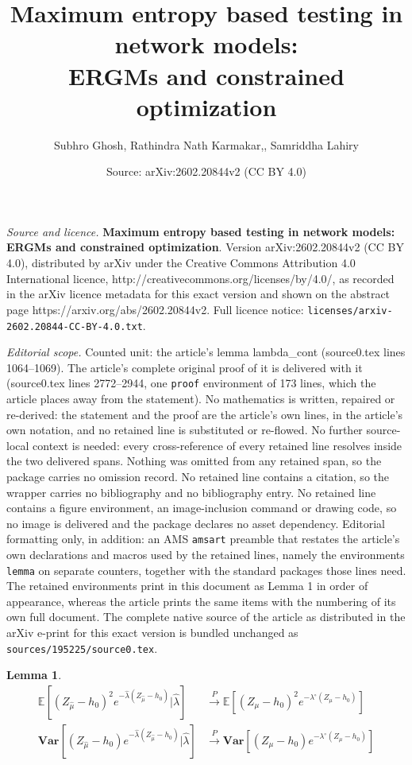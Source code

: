 \documentclass[10pt,a4paper]{amsart}
\title{\textbf{Maximum entropy based testing in network models: \\ ERGMs and constrained optimization}}
\author{Subhro Ghosh, Rathindra Nath Karmakar,, Samriddha Lahiry}
\date{Source: arXiv:2602.20844v2 (CC BY 4.0)}
\newtheorem{lemma}{Lemma}
\begin{document}
\maketitle

\noindent\emph{Source and licence.} \textbf{Maximum entropy based testing in network models: \\ ERGMs and constrained optimization}. Version arXiv:2602.20844v2 (CC BY 4.0), distributed by arXiv under the Creative Commons Attribution 4.0 International licence, http://creativecommons.org/licenses/by/4.0/, as recorded in the arXiv licence metadata for this exact version and shown on the abstract page https://arxiv.org/abs/2602.20844v2. Full licence notice: \texttt{licenses/arxiv-2602.20844-CC-BY-4.0.txt}.\par\smallskip

\noindent\textit{Editorial scope.} Counted unit: the article's lemma lambda\_cont (source0.tex lines 1064--1069). The article's complete original proof of it is delivered with it (source0.tex lines 2772--2944, one \texttt{proof} environment of 173 lines, which the article places away from the statement). No mathematics is written, repaired or re-derived: the statement and the proof are the article's own lines, in the article's own notation, and no retained line is substituted or re-flowed.  No further source-local context is needed: every cross-reference of every retained line resolves inside the two delivered spans.  Nothing was omitted from any retained span, so the package carries no omission record.  No retained line contains a citation, so the wrapper carries no bibliography and no bibliography entry.  No retained line contains a figure environment, an image-inclusion command or drawing code, so no image is delivered and the package declares no asset dependency.  Editorial formatting only, in addition: an AMS \texttt{amsart} preamble that restates the article's own declarations and macros used by the retained lines, namely the environments \texttt{lemma} on separate counters, together with the standard packages those lines need.  The retained environments print in this document as Lemma 1 in order of appearance, whereas the article prints the same items with the numbering of its own full document.  The complete native source of the article as distributed in the arXiv e-print for this exact version is bundled unchanged as \texttt{sources/195225/source0.tex}.
\begin{lemma}{\label{lambda_cont}}
   \begin{align*}
   \mathbb{E}\left[(Z_{\hat{\mu}}-h_0)^2e^{-\hat{\lambda}(Z_{\hat{\mu}}-h_0)}\vert \hat{\lambda}\right]&\xrightarrow{P} \mathbb{E}\left[(Z_{\mu}-h_0)^2e^{-\lambda^{\circ}(Z_{\mu}-h_0)}\right]\\
       \mathbf{Var}\left[(Z_{\hat{\mu}}-h_0)e^{-\hat{\lambda}(Z_{\hat{\mu}}-h_0)}\vert \hat{\lambda}\right]&\xrightarrow{P}\mathbf{Var}\left[(Z_{\mu}-h_0)e^{-\lambda^{\circ}(Z_{\mu}-h_0)}\right]\\
   \end{align*} 
\end{lemma}
\end{document}

